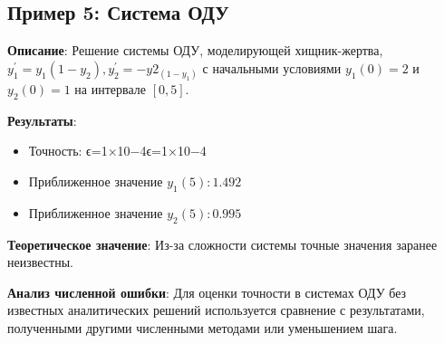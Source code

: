 \subsection{Пример 5: Система ОДУ}

\textbf{Описание}: Решение системы ОДУ, моделирующей хищник-жертва, $y_1^′=y_1(1−y_2), y_2^′=−y2_(1−y_1)$ с начальными условиями $y_1(0)=2$ и $y_2(0)=1$ на интервале $[0,5]$.

\textbf{Результаты}:
\begin{itemize}
\item Точность: ϵ=1×10−4ϵ=1×10−4
\item Приближенное значение $y_1(5): 1.492$
\item Приближенное значение $y_2(5): 0.995$
\end{itemize}

\textbf{Теоретическое значение}: Из-за сложности системы точные значения заранее неизвестны.

\textbf{Анализ численной ошибки}: Для оценки точности в системах ОДУ без известных аналитических решений используется сравнение с результатами, полученными другими численными методами или уменьшением шага.
